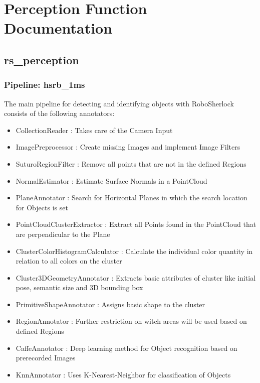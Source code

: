 \documentclass[main.tex]{subfiles}
\begin{document}
\begingroup

\renewcommand{\cleardoublepage}{}

\renewcommand{\clearpage}{}

\chapter{Perception Function Documentation}

		\section{rs\_perception}

			\subsection{Pipeline: hsrb\_1ms}

The main pipeline for detecting and identifying objects with RoboSherlock consists of the following annotators:  
\begin{itemize}
	\item CollectionReader : Takes care of the Camera  Input
	\item ImagePreprocessor : Create missing Images and implement Image Filters  
	\item SuturoRegionFilter : Remove all points that are not in the defined Regions 
	\item NormalEstimator : Estimate Surface Normals in a PointCloud 
	\item PlaneAnnotator : Search for Horizontal Planes in which the search location for Objects is set
	\item PointCloudClusterExtractor : Extract all Points found in the PointCloud that are perpendicular to the Plane 
	\item ClusterColorHistogramCalculator : Calculate the individual color quantity in relation to all colors on the cluster   
	\item Cluster3DGeometryAnnotator : Extracts basic attributes of cluster like initial pose, semantic size and 3D bounding box 
	\item PrimitiveShapeAnnotator : Assigns basic shape to the cluster
	\item RegionAnnotator : Further restriction on witch areas will be used based on defined Regions 
	\item CaffeAnnotator : Deep learning method for Object recognition based on prerecorded Images 
	\item KnnAnnotator : Uses K-Nearest-Neighbor for classification of Objects 
\end{itemize}
\end{document}
